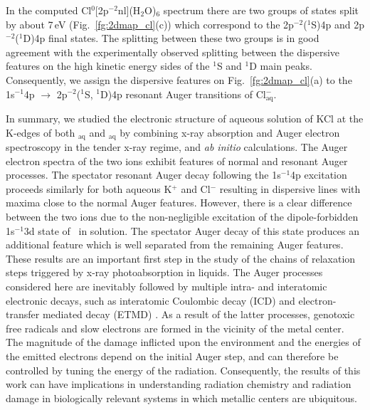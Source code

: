 In the computed Cl$^{0}$[2p$^{-2}$nl](H$_2$O)$_6$ spectrum there are two groups of states split by about 7\,eV (Fig.\ \ref{fg:2dmap_cl}(c)) which correspond to the 2p$^{-2}$($^1$S)4p and 2p$^{-2}$($^1$D)4p final states. The splitting between these two groups is in good agreement with the experimentally observed splitting between the dispersive features on the high kinetic energy sides of the $^1$S and $^1$D main peaks. Consequently, we assign the dispersive features on Fig.\ \ref{fg:2dmap_cl}(a) to the 1s$^{-1}$4p $\rightarrow$ 2p$^{-2}$($^1$S, $^1$D)4p resonant Auger transitions of Cl$^{-}_{\text{aq}}$.


In summary, we studied the electronic structure of aqueous solution of KCl at the K-edges of both \ki$_{\text{aq}}$ and \cli$_{\text{aq}}$ by combining x-ray absorption and Auger electron spectroscopy in the tender x-ray regime, and {\it ab initio} calculations. The Auger electron spectra of the two ions exhibit features of normal and resonant Auger processes. The spectator resonant Auger decay following the 1s$^{-1}$4p excitation proceeds similarly for both aqueous K$^{+}$ and Cl$^{-}$ resulting in dispersive lines with maxima close to the normal Auger features. However, there is a clear difference between the two ions due to the non-negligible excitation of the dipole-forbidden 1s$^{-1}$3d state of \ki~in solution. The spectator Auger decay of this state produces an additional feature which is well separated from the remaining Auger features. These results are an important first step in the study of the chains of relaxation steps triggered by x-ray photoabsorption in liquids. The Auger processes considered here are inevitably followed by multiple intra- and interatomic electronic decays, such as interatomic Coulombic decay (ICD) and electron-transfer mediated decay (ETMD) \citep{unger17:708,Stumpf16:237}. As a result of the latter processes, genotoxic free radicals and slow electrons are formed in the vicinity of the metal center. The magnitude of the damage inflicted upon the environment and the energies of the emitted electrons depend on the initial Auger step, and can therefore be controlled by tuning the energy of the radiation. Consequently, the results of this work can have implications in understanding radiation chemistry and radiation damage in biologically relevant systems in which metallic centers are ubiquitous.